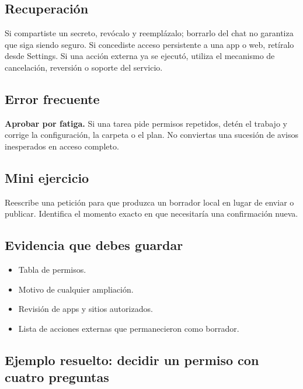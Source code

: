 \documentclass[10pt,a4paper,openany]{book}
\providecommand{\tightlist}{\setlength{\itemsep}{0.18em}\setlength{\parskip}{0pt}}
\begin{document}
\subsection{Recuperación}\label{recuperaciuxf3n-11}

Si compartiste un secreto, revócalo y reemplázalo; borrarlo del chat no
garantiza que siga siendo seguro. Si concediste acceso persistente a una
app o web, retíralo desde Settings. Si una acción externa ya se ejecutó,
utiliza el mecanismo de cancelación, reversión o soporte del servicio.

\subsection{Error frecuente}\label{error-frecuente-13}

\textbf{Aprobar por fatiga.} Si una tarea pide permisos repetidos, detén
el trabajo y corrige la configuración, la carpeta o el plan. No
conviertas una sucesión de avisos inesperados en acceso completo.

\subsection{Mini ejercicio}\label{mini-ejercicio-9}

Reescribe una petición para que produzca un borrador local en lugar de
enviar o publicar. Identifica el momento exacto en que necesitaría una
confirmación nueva.

\subsection{Evidencia que debes
guardar}\label{evidencia-que-debes-guardar-13}

\begin{itemize}
\tightlist
\item
  Tabla de permisos.
\item
  Motivo de cualquier ampliación.
\item
  Revisión de apps y sitios autorizados.
\item
  Lista de acciones externas que permanecieron como borrador.
\end{itemize}

\subsection{Ejemplo resuelto: decidir un permiso con cuatro
preguntas}\label{ejemplo-resuelto-decidir-un-permiso-con-cuatro-preguntas}
\end{document}
